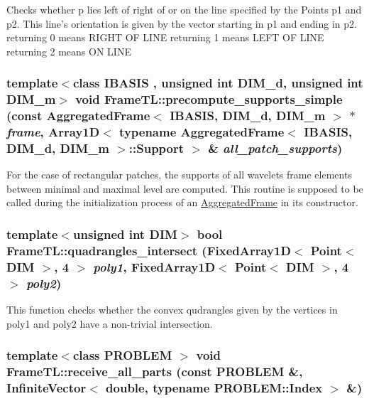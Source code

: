 Checks whether p lies left of right of or on the line specified by the Points p1 and p2. This line's orientation is given by the vector starting in p1 and ending in p2. returning 0 means RIGHT OF LINE returning 1 means LEFT OF LINE returning 2 means ON LINE \hypertarget{namespaceFrameTL_d92777b6b7c3d1dc873761d9280ec994}{
\subsubsection[{precompute\_\-supports\_\-simple}]{\setlength{\rightskip}{0pt plus 5cm}template$<$class IBASIS , unsigned int DIM\_\-d, unsigned int DIM\_\-m$>$ void FrameTL::precompute\_\-supports\_\-simple (const AggregatedFrame$<$ IBASIS, DIM\_\-d, DIM\_\-m $>$ $\ast$ {\em frame}, \/  Array1D$<$ typename AggregatedFrame$<$ IBASIS, DIM\_\-d, DIM\_\-m $>$::Support $>$ \& {\em all\_\-patch\_\-supports})}}
\label{namespaceFrameTL_d92777b6b7c3d1dc873761d9280ec994}


For the case of rectangular patches, the supports of all wavelets frame elements between minimal and maximal level are computed. This routine is supposed to be called during the initialization process of an \hyperlink{classFrameTL_1_1AggregatedFrame}{AggregatedFrame} in its constructor. \hypertarget{namespaceFrameTL_0f4762cff5b194a929e2eadddbfd0d71}{
\subsubsection[{quadrangles\_\-intersect}]{\setlength{\rightskip}{0pt plus 5cm}template$<$unsigned int DIM$>$ bool FrameTL::quadrangles\_\-intersect (FixedArray1D$<$ Point$<$ DIM $>$, 4 $>$ {\em poly1}, \/  FixedArray1D$<$ Point$<$ DIM $>$, 4 $>$ {\em poly2})}}
\label{namespaceFrameTL_0f4762cff5b194a929e2eadddbfd0d71}


This function checks whether the convex qudrangles given by the vertices in poly1 and poly2 have a non-trivial intersection. \hypertarget{namespaceFrameTL_3ea47092508598512ecc54955117a16f}{
\subsubsection[{receive\_\-all\_\-parts}]{\setlength{\rightskip}{0pt plus 5cm}template$<$class PROBLEM $>$ void FrameTL::receive\_\-all\_\-parts (const PROBLEM \&, \/  InfiniteVector$<$ double, typename PROBLEM::Index $>$ \&)}}
\label{namespaceFrameTL_3ea47092508598512ecc54955117a16f}


